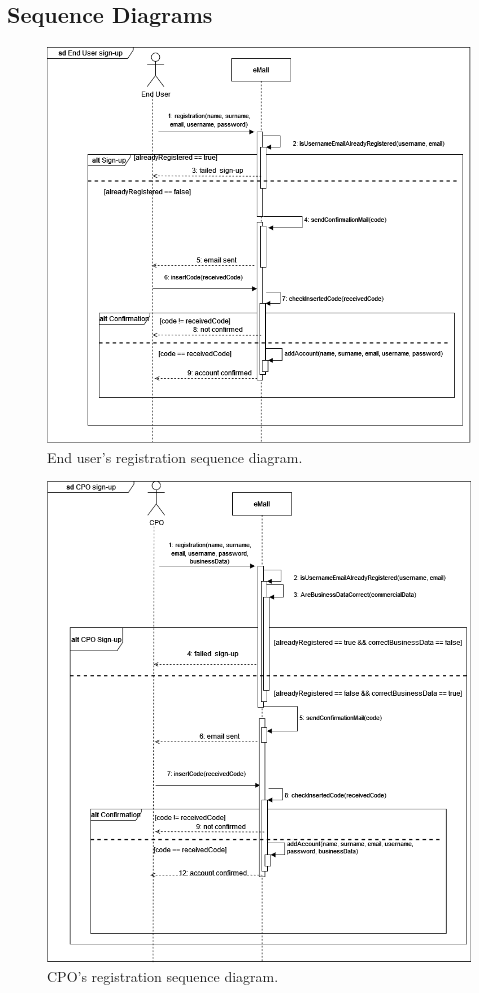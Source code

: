 \subsection{Sequence Diagrams}
\begin{figure}[H]
    \centering
    \includegraphics[width=\textwidth]{images/sd_registration_enduser.png}
    \caption{End user's registration sequence diagram.}
    \label{fig:sd_end_user}
\end{figure}
\begin{figure}[H]
    \centering
    \includegraphics[width=\textwidth]{images/sd_registration_cpo.png}
    \caption{CPO's registration sequence diagram.}
    \label{fig:sd_cpo}
\end{figure}
